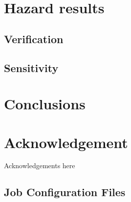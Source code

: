 \documentclass{article}
\begin{document}
\section{Hazard results}
\label{sec:Hazard}

\subsection{Verification}
\label{sec:Verification}

\subsection{Sensitivity}
\label{subsec:Sensitivity}

\section{Conclusions}
\label{sec:Conclusions}

\section*{Acknowledgement}
Acknowledgements here




\begin{appendices}

\section{}
\subsection{Job Configuration Files}
\label{ch:Jobs}



\end{appendices}
\end{document}
